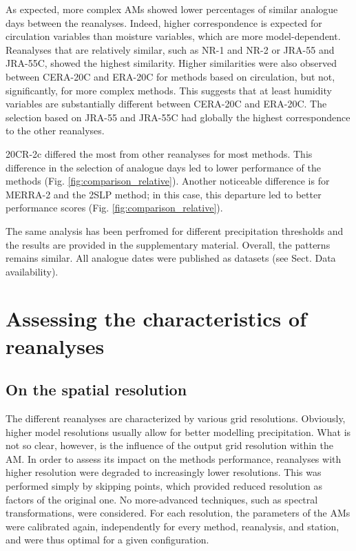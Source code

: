 \documentclass[smallextended]{svjour3}       %
\begin{document}
	As expected, more complex AMs showed lower percentages of similar analogue days between the reanalyses. Indeed, higher correspondence is expected for circulation variables than moisture variables, which are more model-dependent. Reanalyses that are relatively similar, such as NR-1 and NR-2 or JRA-55 and JRA-55C, showed the highest similarity. Higher similarities were also observed between CERA-20C and ERA-20C for methods based on circulation, but not, significantly, for more complex methods. This suggests that at least humidity variables are substantially different between CERA-20C and ERA-20C. The selection based on JRA-55 and JRA-55C had globally the highest correspondence to the other reanalyses.
	
	20CR-2c differed the most from other reanalyses for most methods. This difference in the selection of analogue days led to lower performance of the methods (Fig. \ref{fig:comparison_relative}). Another noticeable difference is for MERRA-2 and the 2SLP method; in this case, this departure led to better performance scores (Fig. \ref{fig:comparison_relative}).
	
	The same analysis has been perfromed for different precipitation thresholds and the results are provided in the supplementary material. Overall, the patterns remains similar. All analogue dates were published as datasets (see Sect. Data availability).
	
	
	\section{Assessing the characteristics of reanalyses}
	\label{sec:analyzes}
	
	\subsection{On the spatial resolution}
	\label{sec:resolution}
	
	The different reanalyses are characterized by various grid resolutions. Obviously, higher model resolutions usually allow for better modelling precipitation. What is not so clear, however, is the influence of the output grid resolution within the AM. In order to assess its impact on the methods performance, reanalyses with higher resolution were degraded to increasingly lower resolutions. This was performed simply by skipping points, which provided reduced resolution as factors of the original one. No more-advanced techniques, such as spectral transformations, were considered. For each resolution, the parameters of the AMs were calibrated again, independently for every method, reanalysis, and station, and were thus optimal for a given configuration. 
	
\end{document}
